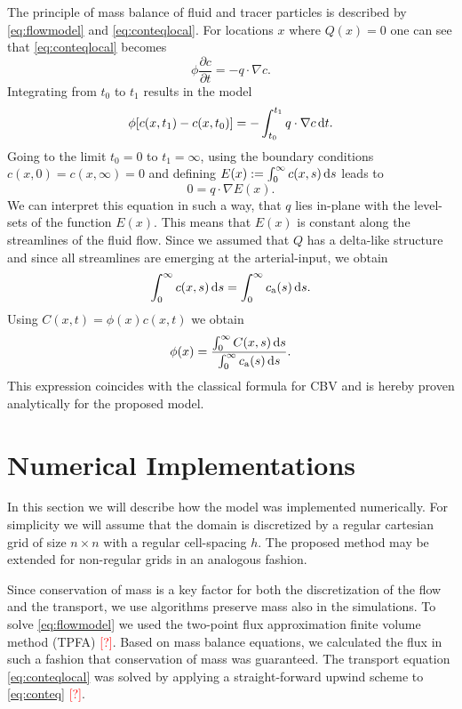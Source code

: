 \documentclass[paper=a4, fontsize=11pt,parskip=half,headings=small]{scrartcl}
\newcommand{\ca}{c_\mathrm{a}}
\newcommand{\missingsource}{\textcolor{red}{[?]}}
\begin{document}
	The principle of mass balance of fluid and tracer particles is described by \eqref{eq:flowmodel} and \eqref{eq:conteqlocal}. 
	For locations $x$ where $Q(x) = 0$ one can see that \eqref{eq:conteqlocal} becomes
	\[
		\phi\frac{\partial c}{\partial t}  = - q \cdot \nabla c.
		\label{eq:1cmodel}
	\]
	Integrating from $t_0$ to $t_1$ results in the model
	\[
		\phi [c(x,t_1) - c(x,t_0)]  = - \int_{t_0}^{t_1}q \cdot  \nabla c \,\mathrm{d} t.
	\]
	Going to the limit $t_0 = 0$ to $t_1 = \infty$, using the boundary conditions $c(x,0) = c(x,\infty) = 0$ and defining $E(x):= \int_0^\infty c(x,s) \,\mathrm{d} s$ leads to
	\[
		0 = q \cdot \nabla  E(x).
		\label{eq:streamlinezero}
	\]
	We can interpret this equation in such a way, that $q$ lies in-plane with the level-sets of the function $E(x)$.
	This means that $E(x)$ is constant along the streamlines of the fluid flow.
	Since we assumed that $Q$ has a delta-like structure and since all streamlines are emerging at the arterial-input, we obtain
	\[
		\int_0^\infty c(x,s) \diffint s = \int_0^\infty \ca(s) \diffint s.
	\]
	Using $C(x,t) = \phi(x) c(x,t)$ we obtain
	\begin{equation}
		\phi(x) =  \frac{ \int_{0}^{\infty} C(x,s) \diffint s }{ \int_{0}^{\infty} \ca(s) \diffint s}.
		\label{eq:phi}
	\end{equation}
	This expression coincides with the classical formula for CBV and is hereby proven analytically for the proposed model.
	
	
	
	

	
	\section{Numerical Implementations}
	
	In this section we will describe how the model was implemented numerically.
	For simplicity we will assume that the domain is discretized by a regular cartesian grid of size $n \times n$ with a regular cell-spacing $h$.
	The proposed method may be extended for non-regular grids in an analogous fashion.
	
	Since conservation of mass is a key factor for both the discretization of the flow and the transport, we use algorithms preserve mass also in the simulations.
	To solve \eqref{eq:flowmodel} we used the two-point flux approximation finite volume method (TPFA) \missingsource. 
	Based on mass balance equations, we calculated the flux in such a fashion that conservation of mass was guaranteed.
	The transport equation \eqref{eq:conteqlocal} was solved by applying a straight-forward upwind scheme to \eqref{eq:conteq} \missingsource.
\end{document}
